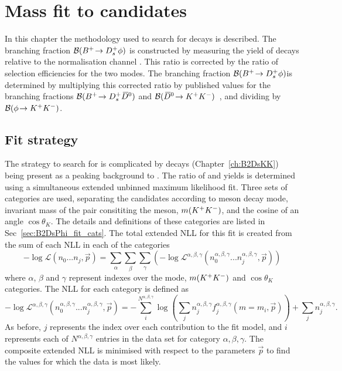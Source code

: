 \chapter{Mass fit to \decay{\Bp}{\Dsp\phiz} candidates} 
\label{ch:B2DsPhi}

\minitoc

In this chapter the methodology used to search for \decay{\Bp}{\Dsp\phiz} decays is described.
The branching fraction ${\mathcal{B}}({{{B}^+}}\!\rightarrow {\ensuremath{{D}^+_{s}}}\phi)$ is constructed by measuring the yield of \decay{\Bp}{\Dsp\phiz} decays relative to the normalisation channel \decay{\Bp}{\Dsp\Dzb}. This ratio is corrected by the ratio of selection efficiencies for the two modes. 
The branching fraction ${\mathcal{B}}({{{B}^+}}\!\rightarrow {\ensuremath{{D}^+_{s}}}\phi)$is determined by multiplying this corrected ratio by published values for the branching fractions ${\mathcal{B}}({{{B}^+}}\!\rightarrow {\ensuremath{{D}^+_{s}}}{\ensuremath{{\kern 0.2em\overline{\kern -0.2em D}{}}{}^0}})$ and ${\mathcal{B}}({{\kern 0.2em\overline{\kern -0.2em D}{}}{}^0}\!\rightarrow {\ensuremath{{K}^+}}{\ensuremath{{K}^-}})$~\cite{PDG2016}, and dividing by ${\mathcal{B}}(\phi\!\rightarrow {\ensuremath{{K}^+}}{\ensuremath{{K}^-}})$. 


\section{Fit strategy}
\label{sec:B2DsPhi_fitstrategy}
The strategy to search for \decay{\Bp}{\Dsp\phiz} is complicated by \decay{\Bp}{\Dsp\Kp\Km} decays (Chapter~\ref{ch:B2DsKK}) being present as a peaking background to \decay{\Bp}{\Dsp(\decay{\phiz}{\Kp\Km})}.
The ratio of \decay{\Bp}{\Dsp\phiz} and \decay{\Bp}{\Dsp\Dzb} yields is determined using a simultaneous extended unbinned maximum likelihood fit. Three sets of categories are used, separating the candidates according to \Dsp meson decay mode, invariant mass of the \Kp\Km pair consititing the \phiz meson, $m({{K}^+}{{K}^-})$, and the cosine of an angle $\cos\theta_{K}$. The details and definitions of these categories are listed in Sec~\ref{sec:B2DsPhi_fit_cats}. 
The total extended NLL for this fit is created from the sum of each NLL in each of the categories
\begin{equation}
-\log\mathcal{L}(n_{0}...n_{j},\vec{p}) = \sum_{\alpha} \sum_{\beta} \sum_{\gamma} \left(-\log\mathcal{L^{\alpha,\beta,\gamma}}(n_{0}^{\alpha,\beta,\gamma}...n_{j}^{\alpha,\beta,\gamma},\vec{p}) \right)
\end{equation} 
where $\alpha$, $\beta$ and $\gamma$ represent indexes over the \Dsp mode, $m({{K}^+}{{K}^-})$ and $\cos\theta_{K}$ categories.
The NLL for each category is defined as
\begin{equation}
-\log\mathcal{L^{\alpha,\beta,\gamma}}(n_{0}^{\alpha,\beta,\gamma}...n_{j}^{\alpha,\beta,\gamma},\vec{p}) = -\sum_{i}^{N^{\alpha,\beta,\gamma}} \log \left( \sum_{j} n_{j}^{\alpha,\beta,\gamma} f_{j}^{\alpha,\beta,\gamma}(m=m_{i},\vec{p}) \right) + \sum_{j}n_{j}^{\alpha,\beta,\gamma}.
\end{equation} 
As before, $j$ represents the index over each contribution to the fit model, and $i$ represents each of $N^{\alpha,\beta,\gamma}$ entries in the data set for category $\alpha,\beta,\gamma$. 
The composite extended NLL is minimised with respect to the parameters $\vec{p}$ to find the values for which the data is most likely.

